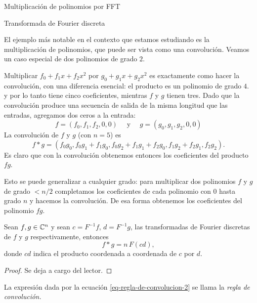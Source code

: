 \begin{chapter}{Multiplicación de polinomios por FFT}
\begin{section}{Transformada de Fourier discreta}
        \begin{ejemplo}\label{ejem-convolucion-polinomios}
            El ejemplo más notable en el contexto  que estamos estudiando es la multiplicación de polinomios, que puede ser vista como  una convolución. Veamos un caso especial de dos polinomios de grado $2$. 
            
            Multiplicar $f_0 + f_1x + f_2x^2$ por $g_0 + g_1x + g_2x^2$ es exactamente como hacer la convolución, con una diferencia esencial: el producto es un polinomio de grado $4$. y por lo tanto tiene cinco coeficientes, mientras $f$ y $g$ tienen tres. Dado que la convolución produce una secuencia de salida de la misma longitud que las entradas, agregamos dos ceros a la entrada:
            \begin{equation*}
                f = (f_0,f_1,f_2,0,0) \quad \text{ y }\quad g = (g_0,g_1,g_2,0,0)
            \end{equation*}
            La convolución de $f$ y $g$ (con $n = 5$) es 
            \begin{equation*}
                f * g = (f_0g_0, f_0g_1 + f_1g_0 , f_0g_2 + f_1g_1+ f_2g_0, f_1g_2 + f_2g_1, f_2g_2 ).
            \end{equation*}
            Es claro que con la convolución obtenemos entonces  los coeficientes del producto $fg$. 

            Esto se puede generalizar a cualquier grado:  para multiplicar dos polinomios $f$ y $g$ de grado $<n/2$ completamos los coeficientes de cada polinomio  con $0$ hasta grado $n$ y hacemos la convolución. De esa forma obtenemos los coeficientes del polinomio $fg$. 
        \end{ejemplo}


        \begin{teorema}\label{th-prod-convolucion-dft}
            Sean $f,g \in \mathbb C^n$ y  sean $c= F^{-1}f$, $d = F^{-1}g$, las transformadas de Fourier discretas de $f$ y $g$ respectivamente, entonces
            \begin{equation}\label{eq-regla-de-convolucion-2}
                f * g = n\,  F(cd),
            \end{equation}
            donde $cd$  indica el producto coordenada a coordenada de $c$ por $d$. 
        \end{teorema}
        \begin{proof}
            Se deja a cargo del lector.
        \end{proof}

        La expresión dada por la ecuación  \eqref{eq-regla-de-convolucion-2} se llama la  \textit{regla de convolución.}


\end{section}
\end{chapter}
